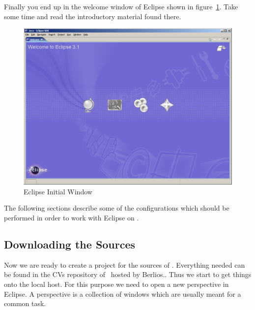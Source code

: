 \documentclass{extex-doc}
\begin{document}
Finally you end up in the welcome window of Eclipse shown in
figure~\ref{fig:eclipse-welcome}. Take some time and read the
introductory material found there.
\begin{figure}[h]
  \centering  \includegraphics[scale=.33]{image/eclipse-welcome}
  \caption{Eclipse Initial Window}\label{fig:eclipse-welcome}
\end{figure}

The following sections describe some of the configurations which
should be performed in order to work with Eclipse on \ExTeX.


\subsection{Downloading the Sources}

Now we are ready to create a project for the sources of \ExTeX.
Everything needed can be found in the CVs repository of \ExTeX\ hosted
by Berlios.. Thus we start to get things onto the local host. For this
purpose we need to open a new perspective in Eclipse. A perspective is
a collection of windows which are usually meant for a common task.
\end{document}
